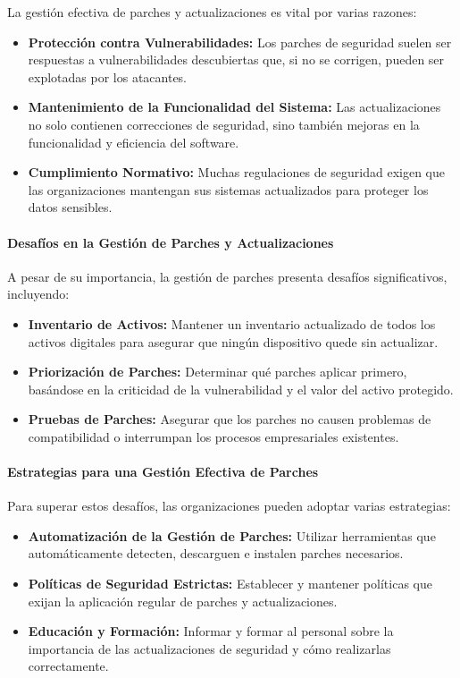 La gestión efectiva de parches y actualizaciones es vital por varias razones:

\begin{itemize}
    \item \textbf{Protección contra Vulnerabilidades:} Los parches de seguridad suelen ser respuestas a vulnerabilidades descubiertas que, si no se corrigen, pueden ser explotadas por los atacantes.
    \item \textbf{Mantenimiento de la Funcionalidad del Sistema:} Las actualizaciones no solo contienen correcciones de seguridad, sino también mejoras en la funcionalidad y eficiencia del software.
    \item \textbf{Cumplimiento Normativo:} Muchas regulaciones de seguridad exigen que las organizaciones mantengan sus sistemas actualizados para proteger los datos sensibles.
\end{itemize}

\paragraph{Desafíos en la Gestión de Parches y Actualizaciones}

A pesar de su importancia, la gestión de parches presenta desafíos significativos, incluyendo:

\begin{itemize}
    \item \textbf{Inventario de Activos:} Mantener un inventario actualizado de todos los activos digitales para asegurar que ningún dispositivo quede sin actualizar.
    \item \textbf{Priorización de Parches:} Determinar qué parches aplicar primero, basándose en la criticidad de la vulnerabilidad y el valor del activo protegido.
    \item \textbf{Pruebas de Parches:} Asegurar que los parches no causen problemas de compatibilidad o interrumpan los procesos empresariales existentes.
\end{itemize}

\paragraph{Estrategias para una Gestión Efectiva de Parches}

Para superar estos desafíos, las organizaciones pueden adoptar varias estrategias:

\begin{itemize}
    \item \textbf{Automatización de la Gestión de Parches:} Utilizar herramientas que automáticamente detecten, descarguen e instalen parches necesarios.
    \item \textbf{Políticas de Seguridad Estrictas:} Establecer y mantener políticas que exijan la aplicación regular de parches y actualizaciones.
    \item \textbf{Educación y Formación:} Informar y formar al personal sobre la importancia de las actualizaciones de seguridad y cómo realizarlas correctamente.
\end{itemize}

